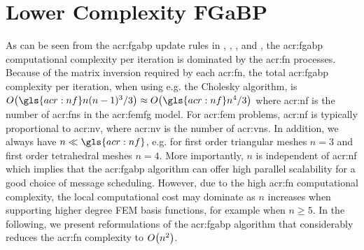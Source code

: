 \section{Lower Complexity FGaBP}
\label{sec:lowerCompFGaBP}

As can be seen from the \gls{acr:fgabp} update rules in , , , and , the \gls{acr:fgabp} computational complexity per iteration is dominated by the \gls{acr:fn} processes.
Because of the matrix inversion required by each \gls{acr:fn}, the total \gls{acr:fgabp} complexity per iteration, when using e.g. the Cholesky algorithm, is $\bigo{\gls{acr:nf} n (n-1)^3/3} \approx \bigo{\gls{acr:nf} n^4/3}$ where \gls{acr:nf} is the number of \glspl{acr:fn} in the \gls{acr:femfg} model.
For \gls{acr:fem} problems, \gls{acr:nf} is typically proportional to \gls{acr:nv}, where \gls{acr:nv} is the number of \glspl{acr:vn}.
In addition, we always have $n\ll \gls{acr:nf}$, e.g. for first order triangular meshes $n=3$ and first order tetrahedral meshes $n=4$.
More importantly, $n$ is independent of \gls{acr:nf} which implies that the \gls{acr:fgabp} algorithm can offer high parallel scalability for a good choice of message scheduling.
However, due to the high \gls{acr:fn} computational complexity, the local computational cost may dominate as $n$ increases when supporting higher degree FEM basis functions, for example when $n \geq 5$.
In the following, we present reformulations of the \gls{acr:fgabp} algorithm that considerably reduces the \gls{acr:fn} complexity to $ O\bigl(n^2\bigr)$.



